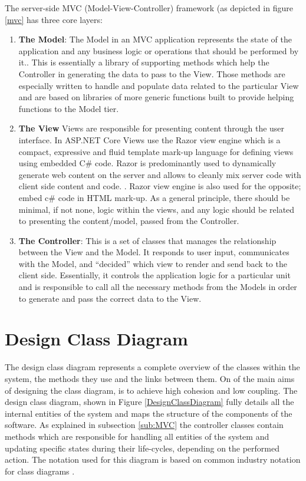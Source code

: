 The server-side MVC (Model-View-Controller) framework (as depicted in figure \ref{mvc} has three core layers:

\begin{enumerate}
\item \textbf{The Model}: The Model in an MVC application represents the state of the application and any business logic or operations that should be performed by it.\cite{mvc}. This is essentially a library of supporting methods which help the Controller in generating the data to pass to the View. Those methods are especially written to handle  and populate data related to the particular View and are based on libraries of more generic functions built to provide helping functions to the Model tier.

\item \textbf{The View} Views are responsible for presenting content through the user interface. In ASP.NET Core Views use the Razor view engine which is a compact, expressive and fluid template mark-up language for defining views using embedded C\# code.  Razor is predominantly used to dynamically generate web content on the server and allows to cleanly mix server code with client side content and code. \cite{mvc}. Razor view engine is also used for the opposite; embed c\# code in HTML mark-up. As a general principle, there should be minimal, if not none, logic within the views, and any logic should be related to presenting the content/model, passed from the Controller.

\item \textbf{The Controller}: This is a set of classes that manages the relationship between the View and the Model\cite{mvcBook}. It responds to user input, communicates with the Model, and ``decided'' which view to render and send back to the client side. Essentially, it controls the application logic for a particular unit and is responsible to call all the necessary methods from the Models in order to generate and pass the correct data to the View.

\end{enumerate}

\section{Design Class Diagram}
\label{design_class_diagram}


The design class diagram represents a complete overview of the classes within the system, the methods they use and the links between them. On of the main aims of designing the class diagram, is to achieve high cohesion and low coupling. The design class diagram, shown in Figure \ref{DesignClassDiagram} fully details all the internal entities of the system and maps the structure of the components of the software. As explained in subsection \ref{sub:MVC} the controller classes contain methods which are responsible for handling all entities of the system and updating specific states during their life-cycles, depending on the performed action. The notation used for this diagram is based on common industry notation for class diagrams \cite{entity_relationship_approach} \cite{object_oriented_modeling_and_design}.


